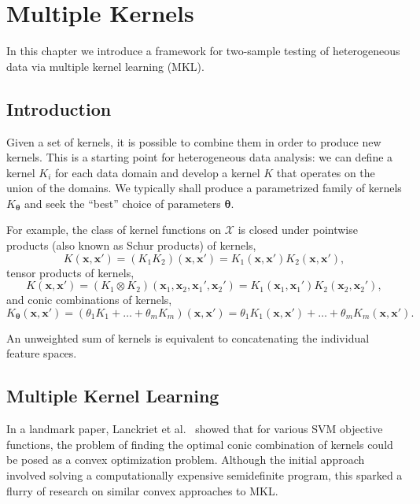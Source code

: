 \graphicspath{{./MKL/img/}}
\chapter{Multiple Kernels}
\label{C:MKL}
In this chapter we introduce a framework for two-sample testing
of heterogeneous data via multiple kernel learning (MKL).

\section{Introduction}
Given a set of kernels, it is possible to combine them in order to produce new
kernels.  This is a starting point for heterogeneous data analysis: we
can define a kernel $K_i$ for each data domain and develop a kernel $K$ that operates
on the union of the domains.  We typically shall produce a parametrized
family of kernels $K_{{\boldsymbol \theta}}$ and seek the ``best'' choice of
parameters ${\boldsymbol \theta}$.

For example, the class of kernel functions on $\mathcal{X}$ is closed under pointwise products
(also known as Schur products) of kernels,
\begin{equation*}
  K({\mathbf x},{\mathbf x}') = (K_1K_2)({\mathbf x},{\mathbf x}')=K_1({\mathbf x},{\mathbf x}')K_2({\mathbf x},{\mathbf x}'),
\end{equation*}
tensor products of kernels,
\begin{equation*}
 K({\mathbf x}, {\mathbf x}') = (K_1 \otimes  K_2)({\mathbf x}_1,{\mathbf x}_2,{\mathbf x}_1',{\mathbf x}_2')=K_1({\mathbf x}_1,{\mathbf x}_1')K_2({\mathbf x}_2,{\mathbf x}_2'),
\end{equation*}
and conic combinations of kernels,
\begin{equation*}
  K_{{\boldsymbol \theta}}({\mathbf x}, {\mathbf x}') = (\theta_1 K_1 + \ldots + \theta_m K_m)({\mathbf x},{\mathbf x}')=
  \theta_1 K_1({\mathbf x},{\mathbf x}') + \ldots + \theta_m K_m({\mathbf x},{\mathbf x}').
\end{equation*}

An unweighted sum of kernels is equivalent to concatenating the individual
feature spaces.

\section{Multiple Kernel Learning}
In a landmark paper, Lanckriet et al.\ \cite{lanckriet2004learning} showed
that for various SVM objective functions, the problem of finding the optimal
conic combination of kernels could be posed as a convex optimization problem.
Although the initial approach involved solving a computationally expensive
semidefinite program, this sparked a flurry of research on similar convex
approaches to MKL.

